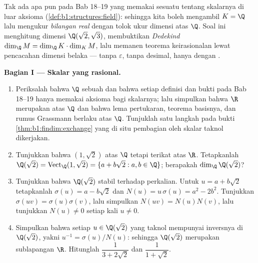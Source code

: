 \begin{problem}\label{pb:b1:findim:1}
Tak ada apa pun pada Bab 18--19 yang memakai sesuatu tentang skalarnya di luar
aksioma  (\cref{def:b1:structures:field}): sehingga kita boleh
mengambil $K = \Q$ lalu mengukur  \emph{bilangan real}
dengan tolok ukur dimensi atas $\Q$. Soal ini menghitung
dimensi $\Q(\sqrt2, \sqrt3)$, membuktikan \emph{
Dedekind} $\dim_\Q M = \dim_\Q K \cdot \dim_K M$, lalu memanen
teorema keirasionalan lewat pencacahan dimensi belaka --- tanpa
$\varepsilon$, tanpa desimal, hanya dengan .

\medskip
\noindent\textbf{Bagian I --- Skalar yang rasional.}
\begin{enumerate}
  \item Periksalah bahwa $\Q$ sebuah  dan bahwa setiap definisi dan
        bukti pada Bab 18--19 hanya memakai aksioma  bagi
        skalarnya; lalu simpulkan bahwa $\R$ merupakan  atas $\Q$ dan
        bahwa lema pertukaran, teorema basisnya, dan
        rumus Grassmann berlaku atas $\Q$. Tunjuklah satu langkah
        pada bukti \cref{thm:b1:findim:exchange} yang di situ
        pembagian oleh skalar taknol dikerjakan.
  \item Tunjukkan bahwa $(1, \sqrt2)$  atas $\Q$ tetapi terikat atas
        $\R$. Tetapkanlah $\Q(\sqrt2) = \operatorname{Vect}_\Q(1,
        \sqrt2) = \{a + b\sqrt2 : a, b \in \Q\}$; berapakah
        $\dim_\Q \Q(\sqrt2)$?
  \item Tunjukkan bahwa $\Q(\sqrt2)$ stabil terhadap perkalian.
        Untuk $u = a + b\sqrt2$ tetapkanlah $\sigma(u) = a - b\sqrt2$ dan
        $N(u) = u\,\sigma(u) = a^2 - 2b^2$. Tunjukkan $\sigma(uv) =
        \sigma(u)\sigma(v)$, lalu simpulkan $N(uv) = N(u)N(v)$, lalu tunjukkan
        $N(u) \neq 0$ setiap kali $u \neq 0$.
  \item Simpulkan bahwa setiap $u \in \Q(\sqrt2)$ yang taknol mempunyai
        inversnya di $\Q(\sqrt2)$, yakni $u^{-1} =
        \sigma(u)/N(u)$: sehingga $\Q(\sqrt2)$ merupakan sublapangan $\R$.
        Hitunglah $\dfrac1{3 + 2\sqrt2}$ dan $\dfrac1{1 + \sqrt2}$.
\end{enumerate}


\end{problem}
